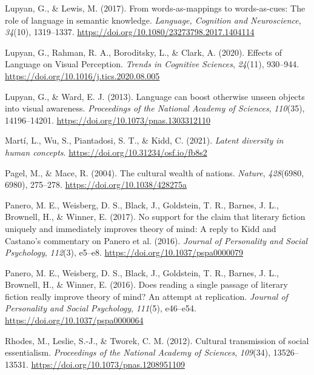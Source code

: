 \documentclass[11pt,man]{article}
\newenvironment{CSLReferences}%
  {}%
  {\par}
\begin{document}
\begin{CSLReferences}{1}{0}
\leavevmode{}%
Lupyan, G., \& Lewis, M. (2017). From words-as-mappings to
words-as-cues: The role of language in semantic knowledge.
\emph{Language, Cognition and Neuroscience}, \emph{34}(10), 1319--1337.
\url{https://doi.org/10.1080/23273798.2017.1404114}

\leavevmode{}%
Lupyan, G., Rahman, R. A., Boroditsky, L., \& Clark, A. (2020). Effects
of {Language} on {Visual Perception}. \emph{Trends in Cognitive
Sciences}, \emph{24}(11), 930--944.
\url{https://doi.org/10.1016/j.tics.2020.08.005}

\leavevmode{}%
Lupyan, G., \& Ward, E. J. (2013). Language can boost otherwise unseen
objects into visual awareness. \emph{Proceedings of the National Academy
of Sciences}, \emph{110}(35), 14196--14201.
\url{https://doi.org/10.1073/pnas.1303312110}

\leavevmode{}%
Martí, L., Wu, S., Piantadosi, S. T., \& Kidd, C. (2021). \emph{Latent
diversity in human concepts}.
\url{https://doi.org/10.31234/osf.io/fb8s2}

\leavevmode{}%
Pagel, M., \& Mace, R. (2004). The cultural wealth of nations.
\emph{Nature}, \emph{428}(6980, 6980), 275--278.
\url{https://doi.org/10.1038/428275a}

\leavevmode{}%
Panero, M. E., Weisberg, D. S., Black, J., Goldstein, T. R., Barnes, J.
L., Brownell, H., \& Winner, E. (2017). No support for the claim that
literary fiction uniquely and immediately improves theory of mind: {A}
reply to {Kidd} and {Castano}'s commentary on {Panero} et al. (2016).
\emph{Journal of Personality and Social Psychology}, \emph{112}(3),
e5--e8. \url{https://doi.org/10.1037/pspa0000079}

\leavevmode{}%
Panero, M. E., Weisberg, D. S., Black, J., Goldstein, T. R., Barnes, J.
L., Brownell, H., \& Winner, E. (2016). Does reading a single passage of
literary fiction really improve theory of mind? {An} attempt at
replication. \emph{Journal of Personality and Social Psychology},
\emph{111}(5), e46--e54. \url{https://doi.org/10.1037/pspa0000064}

\leavevmode{}%
Rhodes, M., Leslie, S.-J., \& Tworek, C. M. (2012). Cultural
transmission of social essentialism. \emph{Proceedings of the National
Academy of Sciences}, \emph{109}(34), 13526--13531.
\url{https://doi.org/10.1073/pnas.1208951109}


\end{CSLReferences}
\end{document}
